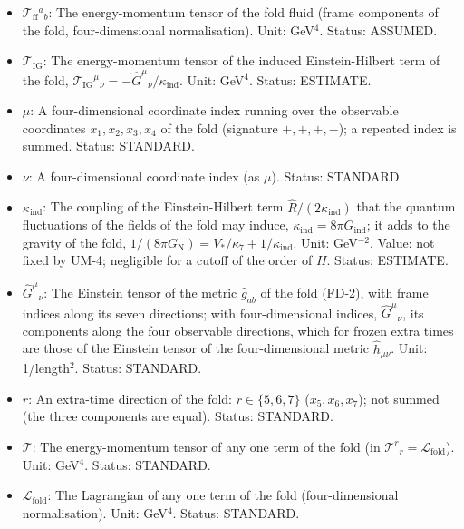 \documentclass[
  10pt,
]{article}
\begin{document}
\begin{itemize}
\item
  \(\mathcal{T}_{\mathrm{ff}}{}^a{}_b\): The energy-momentum tensor of
  the fold fluid (frame components of the fold, four-dimensional
  normalisation). Unit: GeV\(^4\). Status: ASSUMED.
\item
  \(\mathcal{T}_{\mathrm{IG}}\): The energy-momentum tensor of the
  induced Einstein-Hilbert term of the fold,
  \(\mathcal{T}_{\mathrm{IG}}{}^\mu{}_\nu = -\hat G^\mu{}_\nu/\kappa_{\mathrm{ind}}\).
  Unit: GeV\(^4\). Status: ESTIMATE.
\item
  \(\mu\): A four-dimensional coordinate index running over the
  observable coordinates \(x_1, x_2, x_3, x_4\) of the fold (signature
  \(+,+,+,-\)); a repeated index is summed. Status: STANDARD.
\item
  \(\nu\): A four-dimensional coordinate index (as \(\mu\)). Status:
  STANDARD.
\item
  \(\kappa_{\mathrm{ind}}\): The coupling of the Einstein-Hilbert term
  \(\hat R/(2\kappa_{\mathrm{ind}})\) that the quantum fluctuations of
  the fields of the fold may induce,
  \(\kappa_{\mathrm{ind}} = 8\pi G_{\mathrm{ind}}\); it adds to the
  gravity of the fold,
  \(1/(8\pi G_{\mathrm{N}}) = V_*/\kappa_7 + 1/\kappa_{\mathrm{ind}}\).
  Unit: GeV\(^{-2}\). Value: not fixed by UM-4; negligible for a cutoff
  of the order of \(H\). Status: ESTIMATE.
\item
  \(\hat G^\mu{}_\nu\): The Einstein tensor of the metric
  \(\hat g_{ab}\) of the fold (FD-2), with frame indices along its seven
  directions; with four-dimensional indices, \(\hat G^\mu{}_\nu\), its
  components along the four observable directions, which for frozen
  extra times are those of the Einstein tensor of the four-dimensional
  metric \(\hat h_{\mu\nu}\). Unit: 1/length\(^2\). Status: STANDARD.
\item
  \(r\): An extra-time direction of the fold: \(r \in \{5, 6, 7\}\)
  (\(x_5, x_6, x_7\)); not summed (the three components are equal).
  Status: STANDARD.
\item
  \(\mathcal{T}\): The energy-momentum tensor of any one term of the
  fold (in \(\mathcal{T}^r{}_r = \mathcal{L}_{\mathrm{fold}}\)). Unit:
  GeV\(^4\). Status: STANDARD.
\item
  \(\mathcal{L}_{\mathrm{fold}}\): The Lagrangian of any one term of the
  fold (four-dimensional normalisation). Unit: GeV\(^4\). Status:
  STANDARD.
\end{itemize}
\end{document}

